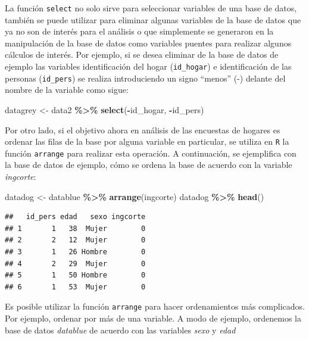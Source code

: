 \documentclass[
  spanish,
  12pt,
]{book}
\newenvironment{Shaded}{\begin{snugshade}}{\end{snugshade}}
\newcommand{\FunctionTok}[1]{\textcolor[rgb]{0.13,0.29,0.53}{\textbf{#1}}}
\newcommand{\NormalTok}[1]{#1}
\newcommand{\OtherTok}[1]{\textcolor[rgb]{0.56,0.35,0.01}{#1}}
\newcommand{\SpecialCharTok}[1]{\textcolor[rgb]{0.81,0.36,0.00}{\textbf{#1}}}
\begin{document}
La función \texttt{select} no solo sirve para seleccionar variables de una base de datos, también se puede utilizar para eliminar algunas variables de la base de datos que ya no son de interés para el análisis o que simplemente se generaron en la manipulación de la base de datos como variables puentes para realizar algunos cálculos de interés. Por ejemplo, si se desea eliminar de la base de datos de ejemplo las variables identificación del hogar (\texttt{id\_hogar}) e identificación de las personas (\texttt{id\_pers}) se realiza introduciendo un signo ``menos'' (-) delante del nombre de la variable como sigue:

\begin{Shaded}
\begin{Highlighting}[]
\NormalTok{datagrey }\OtherTok{\textless{}{-}}\NormalTok{ data2 }\SpecialCharTok{\%\textgreater{}\%} \FunctionTok{select}\NormalTok{(}\SpecialCharTok{{-}}\NormalTok{id\_hogar, }\SpecialCharTok{{-}}\NormalTok{id\_pers)}
\end{Highlighting}
\end{Shaded}

Por otro lado, si el objetivo ahora en análisis de las encuestas de hogares es ordenar las filas de la base por alguna variable en particular, se utiliza en \texttt{R} la función \texttt{arrange} para realizar esta operación. A continuación, se ejemplifica con la base de datos de ejemplo, cómo se ordena la base de acuerdo con la variable \emph{ingcorte}:

\begin{Shaded}
\begin{Highlighting}[]
\NormalTok{datadog }\OtherTok{\textless{}{-}}\NormalTok{ datablue }\SpecialCharTok{\%\textgreater{}\%} \FunctionTok{arrange}\NormalTok{(ingcorte)}
\NormalTok{datadog }\SpecialCharTok{\%\textgreater{}\%} \FunctionTok{head}\NormalTok{()}
\end{Highlighting}
\end{Shaded}

\begin{verbatim}
##   id_pers edad   sexo ingcorte
## 1       1   38  Mujer        0
## 2       2   12  Mujer        0
## 3       1   26 Hombre        0
## 4       2   29  Mujer        0
## 5       1   50 Hombre        0
## 6       1   53  Mujer        0
\end{verbatim}

Es posible utilizar la función \texttt{arrange} para hacer ordenamientos más complicados. Por ejemplo, ordenar por más de una variable. A modo de ejemplo, ordenemos la base de datos \emph{datablue} de acuerdo con las variables \emph{sexo} y \emph{edad}
\end{document}

